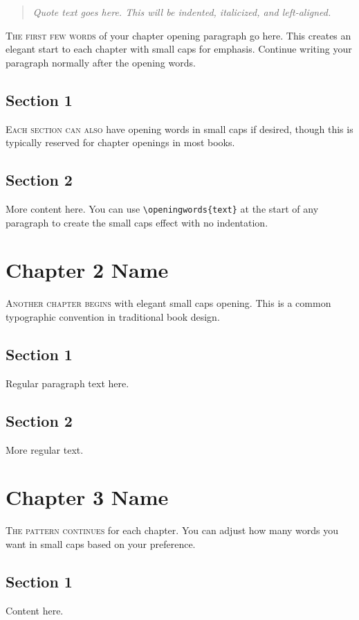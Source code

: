 \documentclass[a5paper,11pt]{book}
\newcommand{\openingwords}[1]{\noindent\textsc{#1}}
\newcommand{\chapterquote}[1]{%
  \begin{quote}
    \itshape #1
  \end{quote}
}
\begin{document}
\chapterquote{Quote text goes here. This will be indented, italicized, and left-aligned.}

\openingwords{The first few words} of your chapter opening paragraph go here. This creates an elegant start to each chapter with small caps for emphasis. Continue writing your paragraph normally after the opening words.

\section{Section 1}

\openingwords{Each section can also} have opening words in small caps if desired, though this is typically reserved for chapter openings in most books.

\section{Section 2}

More content here. You can use \texttt{\textbackslash openingwords\{text\}} at the start of any paragraph to create the small caps effect with no indentation.

\chapter{Chapter 2 Name}

\openingwords{Another chapter begins} with elegant small caps opening. This is a common typographic convention in traditional book design.

\section{Section 1}
Regular paragraph text here.

\section{Section 2}
More regular text.

\chapter{Chapter 3 Name}

\openingwords{The pattern continues} for each chapter. You can adjust how many words you want in small caps based on your preference.

\section{Section 1}
Content here.
\end{document}
